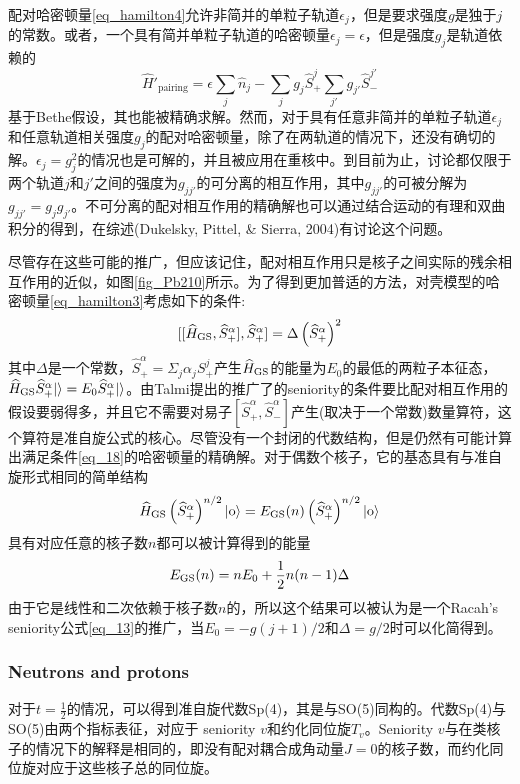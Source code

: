配对哈密顿量\ref{eq_hamilton4}允许非简并的单粒子轨道$\epsilon_j$，但是要求强度$g$是独于$j$的常数。或者，一个具有简并单粒子轨道的哈密顿量$\epsilon_j=\epsilon$，但是强度$g_j$是轨道依赖的
\begin{equation}
\widehat{H}'_\textrm{pairing}=\epsilon\sum_j\widehat{n}_j-\sum_jg_j\widehat{S}^j_+\sum_{j'}g_{j'}\widehat{S}^{j'}_-
\end{equation}
基于Bethe假设，其也能被精确求解。然而，对于具有任意非简并的单粒子轨道$\epsilon_j$和任意轨道相关强度$g_j$的配对哈密顿量，除了在两轨道的情况下，还没有确切的解。$\epsilon_j=g_j^2$的情况也是可解的，并且被应用在重核中。到目前为止，讨论都仅限于两个轨道$j$和$j'$之间的强度为$g_{jj'}$的可分离的相互作用，其中$g_{jj'}$的可被分解为$g_{jj'}=g_jg_{j'}$。不可分离的配对相互作用的精确解也可以通过结合运动的有理和双曲积分的得到，在综述(Dukelsky, Pittel, \& Sierra, 2004)有讨论这个问题。

尽管存在这些可能的推广，但应该记住，配对相互作用只是核子之间实际的残余相互作用的近似，如图\ref{fig_Pb210}所示。为了得到更加普适的方法，对壳模型的哈密顿量\ref{eq_hamilton3}考虑如下的条件:
\begin{equation}\label{eq_18}
[[\widehat{H}_{\rm GS},\widehat{S}_+^\alpha],\widehat{S}_+^\alpha]=\Delta\left(\widehat{S}^\alpha_+\right)^2
\end{equation}
其中$\Delta$是一个常数，$\widehat{S}_+^\alpha=\Sigma_j\alpha_j S_+^j$产生$\widehat{H}_{\rm GS}$的能量为$E_0$的最低的两粒子本征态，$\widehat{H}_{\rm GS}\widehat{S}_+^\alpha|{\rm}\rangle=E_0\widehat{S}_+^\alpha|{\rm}\rangle$。由Talmi提出的推广了的seniority的条件要比配对相互作用的假设要弱得多，并且它不需要对易子$[\widehat{S}_+^\alpha,\widehat{S}_-^\alpha]$产生(取决于一个常数)数量算符，这个算符是准自旋公式的核心。尽管没有一个封闭的代数结构，但是仍然有可能计算出满足条件\ref{eq_18}的哈密顿量的精确解。对于偶数个核子，它的基态具有与准自旋形式相同的简单结构
\begin{equation}
\widehat{H}_{\rm GS}\left(\widehat{S}_+^\alpha\right)^{n/2}|{\rm o}\rangle=E_{\rm GS}(n)\left(\widehat{S}_+^\alpha\right)^{n/2}|{\rm o}\rangle
\end{equation}
具有对应任意的核子数$n$都可以被计算得到的能量
\begin{equation}
E_{\rm GS}(n)=nE_0+\frac{1}{2}n(n-1)\Delta
\end{equation}
由于它是线性和二次依赖于核子数$n$的，所以这个结果可以被认为是一个Racah's seniority公式\ref{eq_13}的推广，当$E_0=-g(j+1)/2$和$\Delta=g/2$时可以化简得到。

\subsubsection{Neutrons and protons}
对于$t=\frac{1}{2}$的情况，可以得到准自旋代数Sp(4)，其是与SO(5)同构的。代数Sp(4)与SO(5)由两个指标表征，对应于 seniority $v$和约化同位旋$T_v$。Seniority $v$与在类核子的情况下的解释是相同的，即没有配对耦合成角动量$J=0$的核子数，而约化同位旋对应于这些核子总的同位旋。

